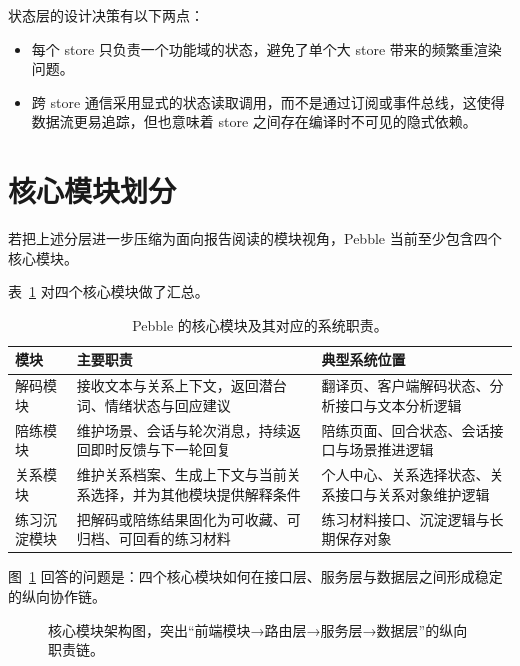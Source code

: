 状态层的设计决策有以下两点：

\begin{itemize}
  \item 每个 store 只负责一个功能域的状态，避免了单个大 store 带来的频繁重渲染问题。
  \item 跨 store 通信采用显式的状态读取调用，而不是通过订阅或事件总线，这使得数据流更易追踪，但也意味着 store 之间存在编译时不可见的隐式依赖。
\end{itemize}


\section{核心模块划分}

若把上述分层进一步压缩为面向报告阅读的模块视角，Pebble 当前至少包含四个核心模块。

表~\ref{tab:pebble-system-modules} 对四个核心模块做了汇总。

\begin{table}[H]
  \centering
  \caption{Pebble 的核心模块及其对应的系统职责。}
  \label{tab:pebble-system-modules}
  \begin{tabularx}{\textwidth}{>{\raggedright\arraybackslash}p{2.4cm} >{\raggedright\arraybackslash}X >{\raggedright\arraybackslash}X}
    \toprule
    模块 & 主要职责 & 典型系统位置 \\
    \midrule
    解码模块 & 接收文本与关系上下文，返回潜台词、情绪状态与回应建议 & 翻译页、客户端解码状态、分析接口与文本分析逻辑 \\
    陪练模块 & 维护场景、会话与轮次消息，持续返回即时反馈与下一轮回复 & 陪练页面、回合状态、会话接口与场景推进逻辑 \\
    关系模块 & 维护关系档案、生成上下文与当前关系选择，并为其他模块提供解释条件 & 个人中心、关系选择状态、关系接口与关系对象维护逻辑 \\
    练习沉淀模块 & 把解码或陪练结果固化为可收藏、可归档、可回看的练习材料 & 练习材料接口、沉淀逻辑与长期保存对象 \\
    \bottomrule
  \end{tabularx}
\end{table}

图~\ref{fig:pebble-service-module-architecture} 回答的问题是：四个核心模块如何在接口层、服务层与数据层之间形成稳定的纵向协作链。

\begin{figure}[H]
  \centering
  
  \caption{核心模块架构图，突出“前端模块→路由层→服务层→数据层”的纵向职责链。}
  \label{fig:pebble-service-module-architecture}
\end{figure}

